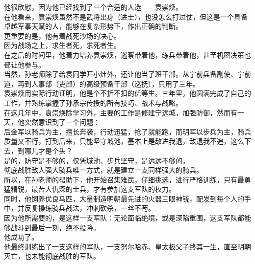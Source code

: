 \begin{multicols}{\theparacolNo}
他很欣慰，因为他已经找到了一个合适的人选——袁崇焕。\\

在他看来，袁崇焕虽然不是武将出身（进士），也没怎么打过仗，但这是一个具备卓越军事天赋的人，能够在复杂形势下，作出正确的判断。\\

更重要的是，他有着战死沙场的决心。\\

因为战场之上，求生者死，求死者生。\\

在之后的时间里，他着力培养袁崇焕，巡察带着他，练兵带着他，甚至机密决策也都让他参与。\\

当然，孙老师除了给袁同学开小灶外，还让他当了班干部。从宁前兵备副使、宁前道，再到人事部（吏部）的高级预备干部（巡抚），只用了三年。\\

袁崇焕用实际行动证明，他是个不折不扣的优等生。三年里，他圆满完成了自己的工作，并熟练掌握了孙承宗传授的所有技巧、战术与战略。\\

在这几年中，袁崇焕除学习外，主要的工作是修建宁远城，加强防御，然而有一天，他突然意识到了一个问题：\\

后金军以骑兵为主，擅长奔袭，行动迅猛，抢了就能跑，而明军以步兵为主，骑兵质量又不行，打到后来，只能坚守城池，基本上是敌进我退，敌退我不追，这么下去，到哪儿才是个头？\\

是的，防守是不够的，仅凭城池、步兵坚守，是远远不够的。\\

彻底战胜敌人强大骑兵唯一方式，就是建立一支同样强大的骑兵。\\

所以，在孙老师的帮助下，他开始召集难民，仔细挑选，进行严格训练，只有最勇猛精锐，最苦大仇深的士兵，才有参加这支军队的权力。\\

同时，他饲养优良马匹，大量制造明朝最先进的火器三眼神铳，配发到每个人的手中，并反复操练骑兵战法，冲刺砍杀，一丝不苟。\\

因为他所需要的，是这样一支军队：无论面临绝境，或是深陷重围，这支军队都能够战斗到最后一刻，绝不投降。\\

他成功了。\\

他最终训练出了一支这样的军队，一支努尔哈赤、皇太极父子终其一生，直至明朝灭亡，也未能彻底战胜的军队。\\


\end{multicols}
